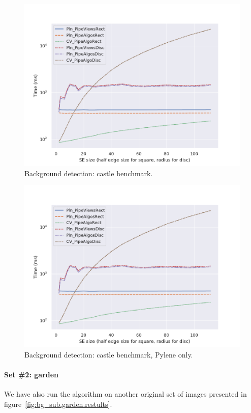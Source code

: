 \begin{figure}[tbh]
  \centering
  \includegraphics[width=.7\linewidth]{figs/bench/PlnVsOpenCV_bg_sub_0}

  \caption{Background detection: castle benchmark.}
  \label{fig:bg_sub.castle.benchmarks}
\end{figure}

\begin{figure}[tbh]
  \centering
  \includegraphics[width=.7\linewidth]{figs/bench/PlnVsOpenCV_bg_sub_0}

  \caption{Background detection: castle benchmark, Pylene only.}
  \label{fig:bg_sub.castle.benchmarks.plnonly}
\end{figure}

\paragraph{Set \#2: garden} We have also run the algorithm on another original set of images presented in
figure~\ref{fig:bg_sub.garden.restults}.

